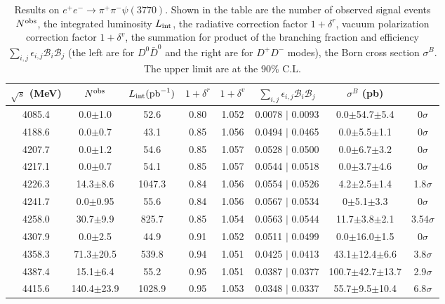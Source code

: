 \documentclass[aps,preprint,superscriptaddress,12pt,tightenlines]{revtex4}
\newcommand{\ddn}{D^0\bar{D}^0}
\newcommand{\ddc}{D^+D^-}
\begin{document}
\begin{table}[htbp]
\caption{Results on $e^{+}e^{-}\to \pi^{+}\pi^{-}\psi(3770)$.
Shown in the table are the number of observed signal events
$N^{\rm obs}$, the integrated luminosity $L_{\rm int}$, the
radiative correction factor $1+\delta^{r}$, vacuum polarization
correction factor $1+\delta^{v}$, the summation for product of the
branching fraction and efficiency $\sum_{i,j}\epsilon_{i,j}
\mathcal{B}_{i}\mathcal{B}_{j}$ (the left are for $\ddn$ and the
right are for $\ddc$ modes), the Born cross section $\sigma^{B}$.
The upper limit are at the 90\% C.L.} \label{RCFDDbar}
\begin{tabular}{c c c c c c c c}
\hline \hline
    $\sqrt{s}$ (MeV)      &$N^{\rm obs}$
    &$L_{\rm int}({\rm pb}^{-1})$  &$1+\delta^{r}$
    &$1+\delta^{v}$  &$\sum_{i,j}\epsilon_{i,j} \mathcal{B}_{i}\mathcal{B}_{j}$
    &$\sigma^{B}$ (pb) \\
    \hline
    4085.4&      0.0$\pm$1.0      &52.6    &0.80 &1.052  &0.0078 $\mid$ 0.0093   &0.0$\pm$54.7$\pm$5.4  &0$\sigma$ \\
     4188.6&      0.0$\pm$0.7     &43.1    &0.85 &1.056  &0.0494 $\mid$ 0.0465   &0.0$\pm$5.5$\pm$1.1    &0$\sigma$ \\
     4207.7&      0.0$\pm$1.2     &54.6    &0.85 &1.057  &0.0528 $\mid$ 0.0500   &0.0$\pm$6.7$\pm$3.2  &0$\sigma$ \\
     4217.1&      0.0$\pm$0.7     &54.1    &0.85 &1.057  &0.0544 $\mid$ 0.0518   &0.0$\pm$3.7$\pm$4.6  &0$\sigma$ \\
     4226.3&      14.3$\pm$8.6    &1047.3  &0.84 &1.056  &0.0554 $\mid$ 0.0526   &4.2$\pm$2.5$\pm$1.4    &1.8$\sigma$ \\
     4241.7&      0.0$\pm$0.95    &55.6    &0.84 &1.056  &0.0567 $\mid$ 0.0534   &0$\pm$5.1$\pm$3.3  &0$\sigma$ \\
     4258.0&      30.7$\pm$9.9    &825.7   &0.85 &1.054  &0.0563 $\mid$ 0.0544   &11.7$\pm$3.8$\pm$2.1   &3.54$\sigma$\\
     4307.9&      0.0$\pm$2.5     &44.9    &0.91 &1.052  &0.0511 $\mid$ 0.0499   &0.0$\pm$16.0$\pm$1.5   &0$\sigma$ \\
     4358.3&      71.3$\pm$20.5   &539.8   &0.94 &1.051  &0.0425 $\mid$ 0.0413   &43.1$\pm$12.4$\pm$6.6  &3.8$\sigma$ \\
     4387.4&      15.1$\pm$6.4    &55.2    &0.95 &1.051  &0.0387 $\mid$ 0.0377   &100.7$\pm$42.7$\pm$13.7 &2.9$\sigma$\\
     4415.6&      140.4$\pm$23.9  &1028.9  &0.95 &1.053  &0.0348 $\mid$ 0.0337   &55.7$\pm$9.5$\pm$10.4  &6.8$\sigma$\\

\end{tabular}
\end{table}
\end{document}
